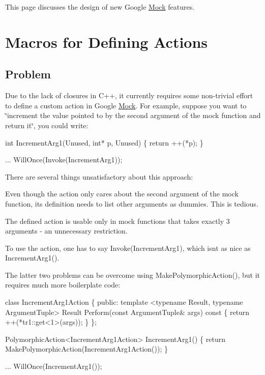 This page discusses the design of new Google \hyperlink{classMock}{Mock} features.

\section*{Macros for Defining Actions}

\subsection*{Problem}

Due to the lack of closures in C++, it currently requires some non-\/trivial effort to define a custom action in Google \hyperlink{classMock}{Mock}. For example, suppose you want to \char`\"{}increment the value pointed to by the
second argument of the mock function and return it\char`\"{}, you could write\+:


\begin{DoxyCode}
\textcolor{keywordtype}{int} IncrementArg1(Unused, \textcolor{keywordtype}{int}* p, Unused) \{
  \textcolor{keywordflow}{return} ++(*p);
\}

... WillOnce(Invoke(IncrementArg1));
\end{DoxyCode}


There are several things unsatisfactory about this approach\+:


\begin{DoxyItemize}
\item Even though the action only cares about the second argument of the mock function, its definition needs to list other arguments as dummies. This is tedious.
\item The defined action is usable only in mock functions that takes exactly 3 arguments -\/ an unnecessary restriction.
\item To use the action, one has to say {\ttfamily Invoke(\+Increment\+Arg1)}, which isn\textquotesingle{}t as nice as {\ttfamily Increment\+Arg1()}.
\end{DoxyItemize}

The latter two problems can be overcome using {\ttfamily Make\+Polymorphic\+Action()}, but it requires much more boilerplate code\+:


\begin{DoxyCode}
\textcolor{keyword}{class }IncrementArg1Action \{
 \textcolor{keyword}{public}:
  \textcolor{keyword}{template} <\textcolor{keyword}{typename} Result, \textcolor{keyword}{typename} ArgumentTuple>
  Result Perform(\textcolor{keyword}{const} ArgumentTuple& args)\textcolor{keyword}{ const }\{
    \textcolor{keywordflow}{return} ++(*tr1::get<1>(args));
  \}
\};

PolymorphicAction<IncrementArg1Action> IncrementArg1() \{
  \textcolor{keywordflow}{return} MakePolymorphicAction(IncrementArg1Action());
\}

... WillOnce(IncrementArg1());
\end{DoxyCode}


